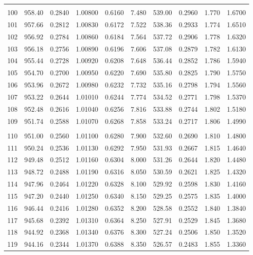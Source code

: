 \documentclass[letter,twosides,10pt]{article}
\begin{document}
\begin{longtable}{|c|c|c|c|c|c|c|c|c|c|}
 & & & & & & & & & \\ 
100 & 958.40 & 0.2840 & 1.00800 & 0.6160 &  7.480 & 539.00 & 0.2960 & 1.770 &  1.6700 \\
101 & 957.66 & 0.2812 & 1.00830 & 0.6172 &  7.522 & 538.36 & 0.2933 & 1.774 &  1.6510 \\
102 & 956.92 & 0.2784 & 1.00860 & 0.6184 &  7.564 & 537.72 & 0.2906 & 1.778 &  1.6320 \\
103 & 956.18 & 0.2756 & 1.00890 & 0.6196 &  7.606 & 537.08 & 0.2879 & 1.782 &  1.6130 \\
104 & 955.44 & 0.2728 & 1.00920 & 0.6208 &  7.648 & 536.44 & 0.2852 & 1.786 &  1.5940 \\
105 & 954.70 & 0.2700 & 1.00950 & 0.6220 &  7.690 & 535.80 & 0.2825 & 1.790 &  1.5750 \\
106 & 953.96 & 0.2672 & 1.00980 & 0.6232 &  7.732 & 535.16 & 0.2798 & 1.794 &  1.5560 \\
107 & 953.22 & 0.2644 & 1.01010 & 0.6244 &  7.774 & 534.52 & 0.2771 & 1.798 &  1.5370 \\
108 & 952.48 & 0.2616 & 1.01040 & 0.6256 &  7.816 & 533.88 & 0.2744 & 1.802 &  1.5180 \\
109 & 951.74 & 0.2588 & 1.01070 & 0.6268 &  7.858 & 533.24 & 0.2717 & 1.806 &  1.4990 \\
 & & & & & & & & & \\ 
110 & 951.00 & 0.2560 & 1.01100 & 0.6280 &  7.900 & 532.60 & 0.2690 & 1.810 &  1.4800 \\
111 & 950.24 & 0.2536 & 1.01130 & 0.6292 &  7.950 & 531.93 & 0.2667 & 1.815 &  1.4640 \\
112 & 949.48 & 0.2512 & 1.01160 & 0.6304 &  8.000 & 531.26 & 0.2644 & 1.820 &  1.4480 \\
113 & 948.72 & 0.2488 & 1.01190 & 0.6316 &  8.050 & 530.59 & 0.2621 & 1.825 &  1.4320 \\
114 & 947.96 & 0.2464 & 1.01220 & 0.6328 &  8.100 & 529.92 & 0.2598 & 1.830 &  1.4160 \\
115 & 947.20 & 0.2440 & 1.01250 & 0.6340 &  8.150 & 529.25 & 0.2575 & 1.835 &  1.4000 \\
116 & 946.44 & 0.2416 & 1.01280 & 0.6352 &  8.200 & 528.58 & 0.2552 & 1.840 &  1.3840 \\
117 & 945.68 & 0.2392 & 1.01310 & 0.6364 &  8.250 & 527.91 & 0.2529 & 1.845 &  1.3680 \\
118 & 944.92 & 0.2368 & 1.01340 & 0.6376 &  8.300 & 527.24 & 0.2506 & 1.850 &  1.3520 \\
119 & 944.16 & 0.2344 & 1.01370 & 0.6388 &  8.350 & 526.57 & 0.2483 & 1.855 &  1.3360 \\

\end{longtable}
\end{document}
